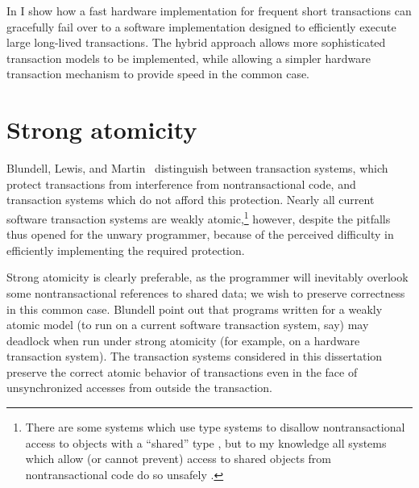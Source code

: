 In  I show how a fast hardware implementation for
frequent short transactions can gracefully fail over to a software
implementation designed to efficiently execute large long-lived
transactions.
The hybrid approach allows more sophisticated transaction models to be
implemented, while allowing a simpler hardware transaction mechanism
to provide speed in the common case.

\section{Strong atomicity}\label{sec:strongatom}
Blundell, Lewis, and Martin~\cite{BlundellLeMa05} distinguish
between 
transaction systems, which protect transactions from interference from
nontransactional code, and  transaction
systems which do not afford this
 protection.
Nearly all current software transaction systems are weakly
atomic,\footnote{There are some systems which use type systems to
disallow nontransactional access to objects with a ``shared'' type
\cite{RudysWa02, HerlihyLuMoSc03, HarrisMaPeHe05}, but to my knowledge
all systems which allow (or cannot prevent) access to shared objects
from nontransactional code do so unsafely
\cite{ShavitTo95,HarrisFr03,Herlihy05b,DiceShSh06,HerlihyLuMo06,FraserHa04}.}
however,
despite the pitfalls thus opened for the unwary programmer, because of
the perceived difficulty in efficiently implementing the required
protection.

Strong atomicity is clearly preferable, as the programmer will
inevitably overlook some nontransactional references to shared data;
we wish to preserve correctness in this common case.
Blundell \etal point out
that programs written for a weakly atomic model (to run on a current software
transaction system, say) may deadlock when run under strong atomicity
(for example, on a hardware transaction system).  The transaction
systems considered in this dissertation preserve the
correct atomic behavior of transactions even in the face of
unsynchronized accesses from outside the transaction.


